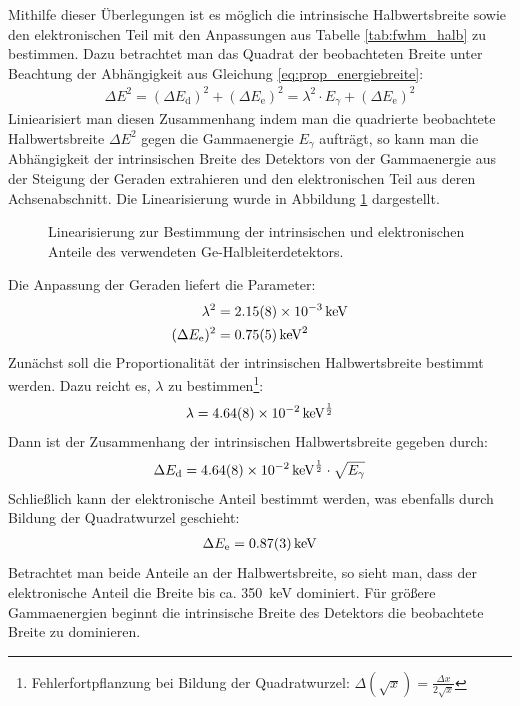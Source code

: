 \documentclass[11pt, a4paper]{article}
\numberwithin{equation}{section}
\begin{document}
Mithilfe dieser Überlegungen ist es möglich die intrinsische Halbwertsbreite sowie den elektronischen Teil mit den Anpassungen aus Tabelle \ref{tab:fwhm_halb} zu bestimmen.
Dazu betrachtet man das Quadrat der beobachteten Breite unter Beachtung der Abhängigkeit aus Gleichung \eqref{eq:prop_energiebreite}:
\begin{align}
	\Delta E^2 = (\Delta E_\mathrm{d})^2 + (\Delta E_\mathrm{e})^2 = \lambda^2 \cdot E_\gamma + (\Delta E_\mathrm{e})^2
\end{align}
Liniearisiert man diesen Zusammenhang indem man die quadrierte beobachtete Halbwertsbreite $\Delta E^2$ gegen die Gammaenergie $E_\gamma$ aufträgt, so kann man die Abhängigkeit der intrinsischen Breite des Detektors von der Gammaenergie aus der Steigung der Geraden extrahieren und den elektronischen Teil aus deren Achsenabschnitt.
Die Linearisierung wurde in Abbildung \ref{fig:lin_fwhm} dargestellt.
\begin{figure}[h]
	\centering
	
	\caption{Linearisierung zur Bestimmung der intrinsischen und elektronischen Anteile des verwendeten Ge-Halbleiterdetektors.}
	\label{fig:lin_fwhm}
\end{figure}
Die Anpassung der Geraden liefert die Parameter:
\begin{align*}
	\lambda^2 &= \SI{2.15 +- 0.08e-3}{\kilo\electronvolt}\\
	(\Delta E_\mathrm{e})^2 &= \SI{0.75 +- 0.05}{\kilo\electronvolt\squared}
\end{align*}
Zunächst soll die Proportionalität der intrinsischen Halbwertsbreite bestimmt werden.
Dazu reicht es, $\lambda$ zu bestimmen\footnote{
Fehlerfortpflanzung bei Bildung der Quadratwurzel: $\Delta (\sqrt{x}) = \frac{\Delta x}{2 \sqrt{x}} $
}:
\begin{align*}
	\lambda = \SI{4.64 +-0.08e-2}{\kilo\electronvolt\tothe{\frac{1}{2}}}
\end{align*}
Dann ist der Zusammenhang der intrinsischen Halbwertsbreite gegeben durch:
\begin{align}
	\Delta E_\mathrm{d} = \SI{4.64 +-0.08e-2}{\kilo\electronvolt\tothe{\frac{1}{2}}} \cdot \sqrt{E_\gamma}
\end{align}
Schließlich kann der elektronische Anteil bestimmt werden, was ebenfalls durch Bildung der Quadratwurzel geschieht:
\begin{align}
	\Delta E_\mathrm{e} = \SI{0.87 +- 0.03}{\kilo\electronvolt}
\end{align}
Betrachtet man beide Anteile an der Halbwertsbreite, so sieht man, dass der elektronische Anteil die Breite bis ca. \SI{350}{\kilo\electronvolt} dominiert.
Für größere Gammaenergien beginnt die intrinsische Breite des Detektors die beobachtete Breite zu dominieren.
\end{document}
